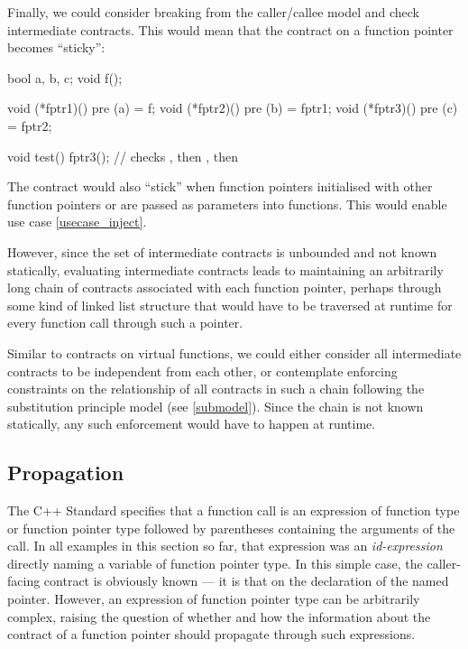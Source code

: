 Finally, we could consider breaking from the caller/callee model and check intermediate contracts. This would mean that the contract on a function pointer becomes ``sticky'':
\begin{codeblock}
bool a, b, c;
void f();

void (*fptr1)() pre (a) = f;
void (*fptr2)() pre (b) = fptr1;
void (*fptr3)() pre (c) = fptr2;

void test() {
  fptr3();  // checks , then , then 
}
\end{codeblock}
The contract would also ``stick'' when function pointers initialised with other function pointers or are passed as parameters into functions. This would enable use case \ref{usecase_inject}.

However, since the set of intermediate contracts is unbounded and not known statically, evaluating intermediate contracts leads to maintaining an arbitrarily long chain of contracts associated with each function pointer, perhaps through some kind of linked list structure that would have to be traversed at runtime for every function call through such a pointer. 

Similar to contracts on virtual functions, we could either consider all intermediate contracts to be independent from each other, or contemplate enforcing constraints on the relationship of all contracts in such a chain following the substitution principle model (see \ref{submodel}). Since the chain is not known statically, any such enforcement would have to happen at runtime.

\subsection{Propagation}
\label{expr}

The C++ Standard specifies that a function call is an expression of function type or function pointer type followed by parentheses containing the arguments of the call. In all examples in this section so far, that expression was an \emph{id-expression} directly naming a variable of function pointer type. In this simple case, the caller-facing contract is obviously known --- it is that on the declaration of the named pointer. However, an expression of function pointer type can be arbitrarily complex, raising the question of whether and how the information about the contract of a function pointer should propagate through such expressions.

